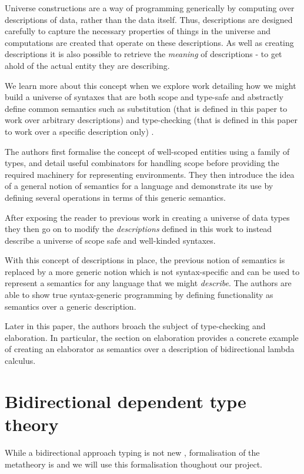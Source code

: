 Universe constructions are a way of programming generically by
computing over descriptions of data, rather than the data itself. Thus,
descriptions are designed carefully to capture the necessary properties of
things in the universe and computations are created that operate on
these descriptions. As well as creating descriptions it is also
possible to retrieve the \emph{meaning} of descriptions - to get ahold of
the actual entity they are describing.

We learn more about this concept when we
explore work detailing how we might build a universe of
syntaxes that are both scope and type-safe and abstractly
define common semantics such as substitution (that is defined in this
paper to work over arbitrary descriptions) and type-checking (that is
defined in this paper to work over a specific description only)
\cite{DBLP:journals/corr/abs-2001-11001}.

The authors first formalise the concept of well-scoped entities
using a family of types, and detail useful combinators for handling
scope before providing the required machinery for representing
environments. They then introduce the idea of a general notion of
semantics for a language and demonstrate its use by defining several
operations in terms of this generic semantics.

After exposing the reader to previous work in creating a universe of
data types \cite{DBLP:conf/icfp/ChapmanDMM10} they then go on to
modify the \emph{descriptions} defined in this work to instead
describe a universe of scope safe and well-kinded syntaxes.

With this concept of descriptions in place, the previous notion of
semantics is replaced by a more generic notion which is not
syntax-specific and can be used to represent a semantics for any
language that we might \emph{describe}. The authors are able to show
true syntax-generic programming by defining functionality as semantics
over a generic description.

Later in this paper, the authors broach the subject of type-checking
and elaboration. In particular, the section on elaboration provides
a concrete example of creating an elaborator as semantics over a
description of bidirectional lambda calculus.

\section{Bidirectional dependent type theory}

While a bidirectional approach typing is not new
\cite{DBLP:journals/toplas/PierceT00}, formalisation of the metatheory
is \cite{TypesWhoSayNi} and we will use this formalisation thoughout
our project. 

